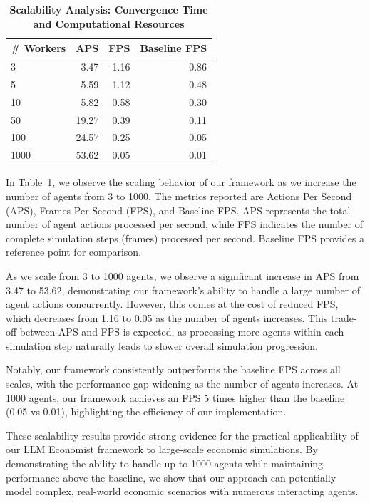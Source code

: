 \begin{table}[h]
\centering
\caption{\textbf{Scalability Analysis: Convergence Time and Computational Resources}}
\label{tab:scalability}
\begin{tabular}{lrrr}
\toprule[1.5pt]
\textbf{\# Workers} & \textbf{APS} & \textbf{FPS} & \textbf{Baseline FPS} \\
\midrule[1pt]
3 & 3.47 & 1.16 & 0.86 \\
5 & 5.59 & 1.12 & 0.48 \\
10 & 5.82 & 0.58 & 0.30 \\
50 & 19.27 & 0.39 & 0.11 \\
100 & 24.57 & 0.25 & 0.05 \\
1000 & 53.62 & 0.05 & 0.01\\
\bottomrule[1.5pt]
\end{tabular}
\end{table}

In Table~\ref{tab:scalability}, we observe the scaling behavior of our framework as we increase the number of agents from 3 to 1000. The metrics reported are Actions Per Second (APS), Frames Per Second (FPS), and Baseline FPS. APS represents the total number of agent actions processed per second, while FPS indicates the number of complete simulation steps (frames) processed per second. Baseline FPS provides a reference point for comparison.

As we scale from 3 to 1000 agents, we observe a significant increase in APS from 3.47 to 53.62, demonstrating our framework's ability to handle a large number of agent actions concurrently. However, this comes at the cost of reduced FPS, which decreases from 1.16 to 0.05 as the number of agents increases. This trade-off between APS and FPS is expected, as processing more agents within each simulation step naturally leads to slower overall simulation progression.

Notably, our framework consistently outperforms the baseline FPS across all scales, with the performance gap widening as the number of agents increases. At 1000 agents, our framework achieves an FPS 5 times higher than the baseline (0.05 vs 0.01), highlighting the efficiency of our implementation.

These scalability results provide strong evidence for the practical applicability of our LLM Economist framework to large-scale economic simulations. By demonstrating the ability to handle up to 1000 agents while maintaining performance above the baseline, we show that our approach can potentially model complex, real-world economic scenarios with numerous interacting agents.
